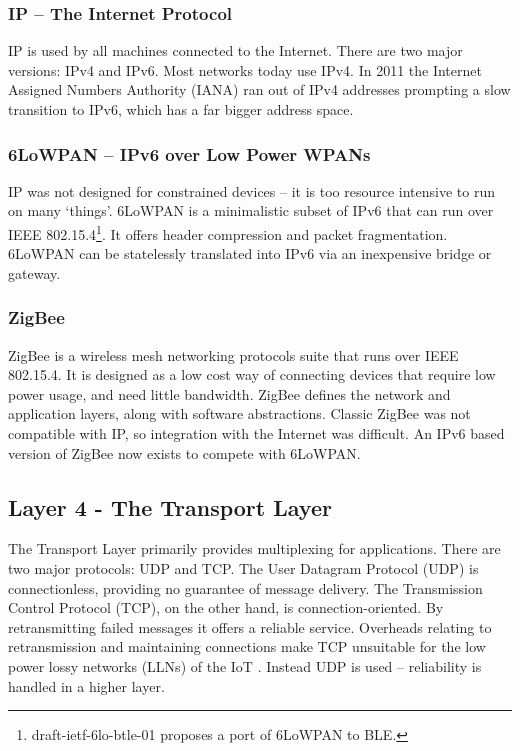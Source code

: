 \documentclass[10pt,journal,compsoc]{IEEEtran}
\begin{document}
\subsubsection{IP -- The Internet Protocol}
IP is used by all machines connected to the Internet. There are two major
versions: IPv4 and IPv6. Most networks today use IPv4. In 2011 the Internet
Assigned Numbers Authority (IANA) ran out of IPv4 addresses \cite{Potaroo}
prompting a slow transition to IPv6, which has a far bigger address space.

\subsubsection{6LoWPAN -- IPv6 over Low Power WPANs}
IP was not designed for constrained devices -- it is too resource intensive to
run on many `things'. 6LoWPAN is a minimalistic subset of IPv6 that can run
over IEEE 802.15.4\footnote{draft-ietf-6lo-btle-01 proposes a port of 6LoWPAN to BLE.}. It
offers header compression and packet fragmentation.  6LoWPAN can be statelessly
translated into IPv6 via an inexpensive bridge or gateway. 

\subsubsection{ZigBee}
ZigBee is a wireless mesh networking protocols suite that runs over IEEE
802.15.4. It is designed as a low cost way of connecting devices that require
low power usage, and need little bandwidth. ZigBee defines the network and
application layers, along with software abstractions. Classic ZigBee was not
compatible with IP, so integration with the Internet was difficult. An IPv6
based version of ZigBee now exists to compete with 6LoWPAN.

\subsection{Layer 4 - The Transport Layer}
The Transport Layer primarily provides multiplexing for applications. There are
two major protocols:  UDP and TCP. The User Datagram Protocol (UDP) is
connectionless, providing no guarantee of message delivery. The Transmission
Control Protocol (TCP), on the other hand, is connection-oriented. By
retransmitting failed messages it offers a reliable service. Overheads relating
to retransmission and maintaining connections make TCP unsuitable for the low
power lossy networks (LLNs) of the IoT \cite{embedded}. Instead UDP is used --
reliability is handled in a higher layer.
\end{document}
